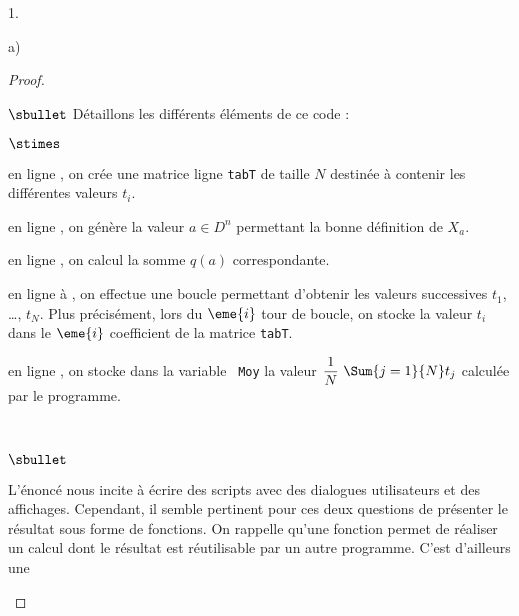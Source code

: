 \documentclass[11pt]{article}%
\begin{document}
\begin{noliste}{1.}
\begin{noliste}{a)}
\begin{proof}
\begin{noliste}{$\sbullet$}
        \noindent
        Détaillons les différents éléments de ce code :
        \begin{noliste}{$\stimes$}
        \item en ligne , on crée une matrice ligne {\tt tabT}
          de taille $N$ destinée à contenir les différentes valeurs
          $t_i$.
        \item en ligne , on génère la valeur $a \in D^n$
          permettant la bonne définition de $X_a$.
        \item en ligne , on calcul la somme $q(a)$
          correspondante.
        \item en ligne  à , on effectue une boucle
          permettant d'obtenir les valeurs successives $t_1$, \ldots,
          $t_N$. Plus précisément, lors du $\eme{i}$ tour de boucle,
          on stocke la valeur $t_i$ dans le $\eme{i}$ coefficient de
          la matrice {\tt tabT}.
        \item en ligne , on stocke dans la variable {\tt
            Moy} la valeur $\dfrac{1}{N} \ \Sum{j=1}{N} t_j$ calculée
          par le programme. 
        \end{noliste}
      \end{noliste}~\\[-.8cm]
      \begin{remarkL}{.98}%
        \begin{noliste}{$\sbullet$}
        \item L'énoncé nous incite à écrire des scripts avec des
          dialogues utilisateurs et des affichages. Cependant, il
          semble pertinent pour ces deux questions de présenter le
          résultat sous forme de fonctions. On rappelle qu'une
          fonction permet de réaliser un calcul dont le résultat est
          réutilisable par un autre programme. C'est d'ailleurs une

\end{noliste}
\end{remarkL}
\end{proof}
\end{noliste}
\end{noliste}
\end{document}
